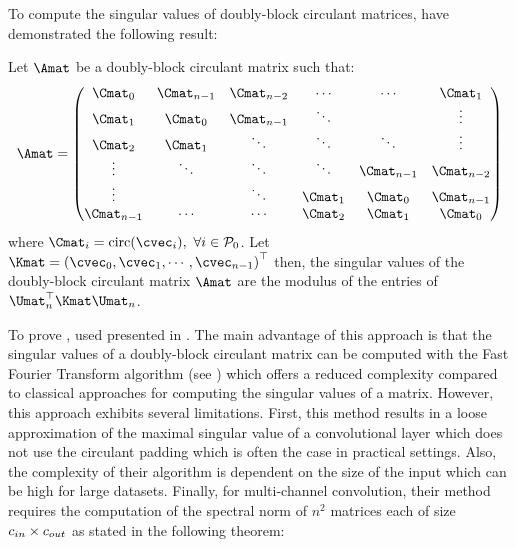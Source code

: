To compute the singular values of doubly-block circulant matrices, \citet{sedghi2018singular} have demonstrated the following result:
\begin{theorem} \label{theorem:ch3-singular_values_doubly_block_circulant}
  Let $\Amat$ be a doubly-block circulant matrix such that:
  \begin{equation*}
    \Amat = \leftmatrix
      \Cmat_0     & \Cmat_{n-1} & \Cmat_{n-2} & \cdots  & \cdots      & \Cmat_1     \\
      \Cmat_1     & \Cmat_0     & \Cmat_{n-1} & \ddots  &             & \vdots      \\
      \Cmat_2     & \Cmat_1     & \ddots      & \ddots  & \ddots      & \vdots      \\
      \vdots      & \ddots      & \ddots      & \ddots  & \Cmat_{n-1} & \Cmat_{n-2} \\
      \vdots      &             & \ddots      & \Cmat_1 & \Cmat_{0}   & \Cmat_{n-1} \\
      \Cmat_{n-1} & \cdots      & \cdots      & \Cmat_2 & \Cmat_{1}   & \Cmat_0
    \rightmatrix
  \end{equation*}
  where $\Cmat_i = \circulant({\cvec_i}),\ \forall i \in \mathcal{P}_0$.
  Let $\Kmat = \leftmat \cvec_0, \cvec_1, \cdots, \cvec_{n-1} \rightmat^\top$ then, the singular values of the doubly-block circulant matrix $\Amat$ are the modulus of the entries of $\Umat_n^\top \Kmat \Umat_n$.
\end{theorem}

\noindent
To prove , \citet{sedghi2018singular} used  presented in .
The main advantage of this approach is that the singular values of a doubly-block circulant matrix can be computed with the Fast Fourier Transform algorithm (see ) which offers a reduced complexity compared to classical approaches for computing the singular values of a matrix. 
However, this approach exhibits several limitations.
First, this method results in a loose approximation of the maximal singular value of a convolutional layer which does not use the circulant padding which is often the case in practical settings.
Also, the complexity of their algorithm is dependent on the size of the input which can be high for large datasets.
Finally, for multi-channel convolution, their method requires the computation of the spectral norm of $n^2$ matrices each of size $c_{in} \times c_{out}$ as stated in the following theorem:

